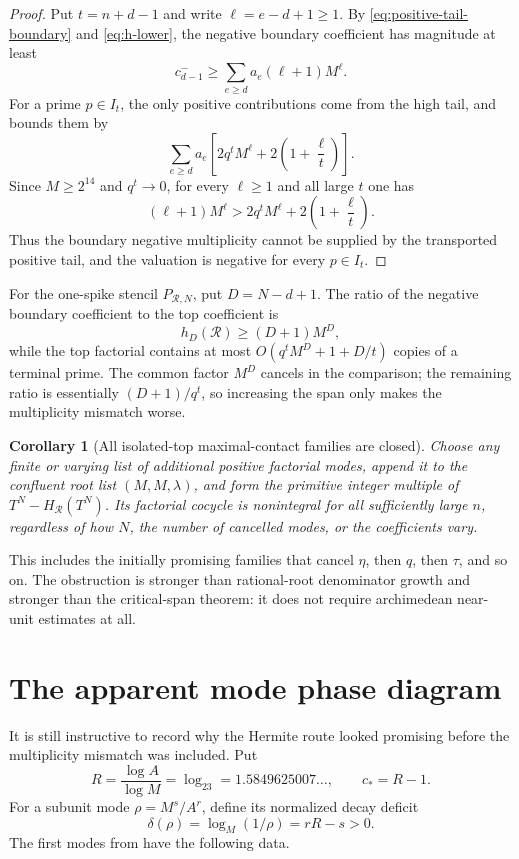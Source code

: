 \documentclass[11pt,oneside]{article}
\newtheorem{corollary}[theorem]{Corollary}
\theoremstyle{definition}
\theoremstyle{remark}
\newcommand{\cstar}{c_{\!*}}
\begin{document}
\begin{proof}
Put $t=n+d-1$ and write $\ell=e-d+1\ge1$.  By
\eqref{eq:positive-tail-boundary} and \eqref{eq:h-lower}, the negative boundary coefficient
has magnitude at least
\[
 c_{d-1}^-\ge\sum_{e\ge d}a_e(\ell+1)M^\ell.
\]
For a prime $p\in I_t$, the only positive contributions come from the high tail, and
 bounds them by
\[
 \sum_{e\ge d}a_e
 \left[2q^tM^\ell+2\left(1+\frac\ell t\right)\right].
\]
Since $M\ge2^{14}$ and $q^t\to0$, for every $\ell\ge1$ and all large $t$ one has
\[
 (\ell+1)M^\ell>
 2q^tM^\ell+2\left(1+\frac\ell t\right).
\]
Thus the boundary negative multiplicity cannot be supplied by the transported positive tail,
and the valuation is negative for every $p\in I_t$.
\end{proof}

For the one-spike stencil $P_{\mathcal R,N}$, put $D=N-d+1$.  The ratio of the negative
boundary coefficient to the top coefficient is
\[
 h_D(\mathcal R)\ge(D+1)M^D,
\]
while the top factorial contains at most
$O(q^tM^D+1+D/t)$ copies of a terminal prime.  The common factor $M^D$ cancels in the
comparison; the remaining ratio is essentially $(D+1)/q^t$, so increasing the span only
makes the multiplicity mismatch worse.

\begin{corollary}[All isolated-top maximal-contact families are closed]
\label{cor:all-hermite-closed}
Choose any finite or varying list of additional positive factorial modes, append it to the
confluent root list $(M,M,\lambda)$, and form the primitive integer multiple of
$T^N-H_{\mathcal R}(T^N)$.  Its factorial cocycle is nonintegral for all sufficiently large
$n$, regardless of how $N$, the number of cancelled modes, or the coefficients vary.
\end{corollary}

This includes the initially promising families that cancel $\eta$, then $q$, then $\tau$,
and so on.  The obstruction is stronger than rational-root denominator growth and stronger
than the critical-span theorem: it does not require archimedean near-unit estimates at all.

\section{The apparent mode phase diagram}
\label{sec:phase-diagram}

It is still instructive to record why the Hermite route looked promising before the
multiplicity mismatch was included.  Put
\[
 R=\frac{\log A}{\log M}=\log_23=1.5849625007\ldots,
 \qquad \cstar=R-1.
\]
For a subunit mode $\rho=M^s/A^r$, define its normalized decay deficit
\[
 \delta(\rho)=\log_M(1/\rho)=rR-s>0.
\]
The first modes from  have the following data.
\end{document}
